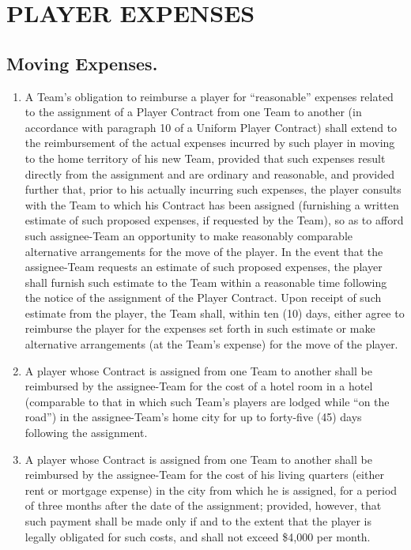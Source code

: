 \documentclass[
]{book}
\providecommand{\tightlist}{%
  \setlength{\itemsep}{0pt}\setlength{\parskip}{0pt}}
\begin{document}
\hypertarget{player-expenses}{%
\chapter{PLAYER EXPENSES}\label{player-expenses}}

\hypertarget{moving-expenses.}{%
\section{Moving Expenses.}\label{moving-expenses.}}

\begin{enumerate}
\def\labelenumi{(\alph{enumi})}
\tightlist
\item
  A Team's obligation to reimburse a player for ``reasonable'' expenses related to the assignment of a Player Contract from one Team to another (in accordance with paragraph 10 of a Uniform Player Contract) shall extend to the reimbursement of the actual expenses incurred by such player in moving to the home territory of his new Team, provided that such expenses result directly from the assignment and are ordinary and reasonable, and provided further that, prior to his actually incurring such expenses, the player consults with the Team to which his Contract has been assigned (furnishing a written estimate of such proposed expenses, if requested by the Team), so as to afford such assignee-Team an opportunity to make reasonably comparable alternative arrangements for the move of the player. In the event that the assignee-Team requests an estimate of such proposed expenses, the player shall furnish such estimate to the Team within a reasonable time following the notice of the assignment of the Player Contract. Upon receipt of such estimate from the player, the Team shall, within ten (10) days, either agree to reimburse the player for the expenses set forth in such estimate or make alternative arrangements (at the Team's expense) for the move of the player.
\item
  A player whose Contract is assigned from one Team to another shall be reimbursed by the assignee-Team for the cost of a hotel room in a hotel (comparable to that in which such Team's players are lodged while ``on the road'') in the assignee-Team's home city for up to forty-five (45) days following the assignment.
\item
  A player whose Contract is assigned from one Team to another shall be reimbursed by the assignee-Team for the cost of his living quarters (either rent or mortgage expense) in the city from which he is assigned, for a period of three months after the date of the assignment; provided, however, that such payment shall be made only if and to the extent that the player is legally obligated for such costs, and shall not exceed \$4,000 per month.

\end{enumerate}
\end{document}
